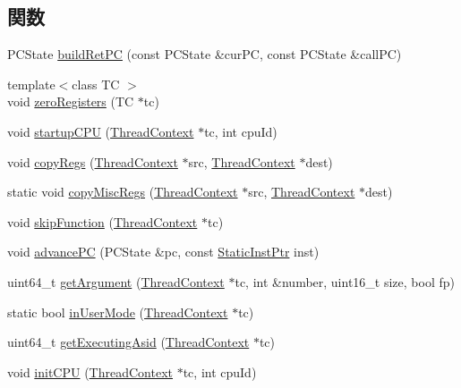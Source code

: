\subsection*{関数}
\begin{DoxyCompactItemize}
\item 
PCState \hyperlink{namespacePowerISA_a361cc11954db6316494498bac005f406}{buildRetPC} (const PCState \&curPC, const PCState \&callPC)
\item 
{\footnotesize template$<$class TC $>$ }\\void \hyperlink{namespacePowerISA_a5aec2a8ae4e23cd090f22e7047c4598e}{zeroRegisters} (TC $\ast$tc)
\item 
void \hyperlink{namespacePowerISA_a6dd6526162d6ccc9efe5269417f96174}{startupCPU} (\hyperlink{classThreadContext}{ThreadContext} $\ast$tc, int cpuId)
\item 
void \hyperlink{namespacePowerISA_aaeffcccf262b0dbd3cbcc8b4cef41168}{copyRegs} (\hyperlink{classThreadContext}{ThreadContext} $\ast$src, \hyperlink{classThreadContext}{ThreadContext} $\ast$dest)
\item 
static void \hyperlink{namespacePowerISA_a3f858968468b53a25f80248755f51083}{copyMiscRegs} (\hyperlink{classThreadContext}{ThreadContext} $\ast$src, \hyperlink{classThreadContext}{ThreadContext} $\ast$dest)
\item 
void \hyperlink{namespacePowerISA_a2624d7d8bac3eb03de2eb6e83903c208}{skipFunction} (\hyperlink{classThreadContext}{ThreadContext} $\ast$tc)
\item 
void \hyperlink{namespacePowerISA_a67312797a70ccb3a25803a8c0dded1a9}{advancePC} (PCState \&pc, const \hyperlink{classRefCountingPtr}{StaticInstPtr} inst)
\item 
uint64\_\-t \hyperlink{namespacePowerISA_a3f9560369e934be05b1dd8f23fbd6104}{getArgument} (\hyperlink{classThreadContext}{ThreadContext} $\ast$tc, int \&number, uint16\_\-t size, bool fp)
\item 
static bool \hyperlink{namespacePowerISA_a73a1fd5ee3c94bf74abe6187141ba21f}{inUserMode} (\hyperlink{classThreadContext}{ThreadContext} $\ast$tc)
\item 
uint64\_\-t \hyperlink{namespacePowerISA_ae7c74a18f017c17c77294a09a7825d91}{getExecutingAsid} (\hyperlink{classThreadContext}{ThreadContext} $\ast$tc)
\item 
void \hyperlink{namespacePowerISA_aded557a1e716c6f849b0e0b05fc77676}{initCPU} (\hyperlink{classThreadContext}{ThreadContext} $\ast$tc, int cpuId)
\end{DoxyCompactItemize}
